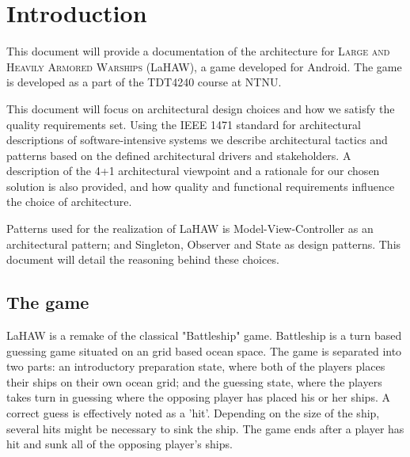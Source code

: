 \chapter{Introduction}
This document will provide a documentation of the architecture for \textsc{Large and Heavily Armored Warships} (LaHAW), a game developed for Android. The game is developed as a part of the TDT4240 course at NTNU.

This document will focus on architectural design choices and how we satisfy the quality requirements set. Using the IEEE 1471 standard for architectural descriptions of software-intensive systems\cite{IEEE1471} we describe architectural tactics and patterns based on the defined architectural drivers and stakeholders. A description of the 4+1 architectural viewpoint\cite{kruchten} and a rationale for our chosen solution is also provided, and how quality and functional requirements influence the choice of architecture.

Patterns used for the realization of LaHAW is Model-View-Controller as an architectural pattern; and Singleton, Observer and State as design patterns. This document will detail the reasoning behind these choices.

	\section{The game}
	LaHAW is a remake of the classical "Battleship" game\cite{battleship}. Battleship is a turn based guessing game situated on an grid based ocean space. The game is separated into two parts: an introductory preparation state, where both of the players places their ships on their own ocean grid; and the guessing state, where the players takes turn in guessing where the opposing player has placed his or her ships. A correct guess is effectively noted as a 'hit'. Depending on the size of the ship, several hits might be necessary to sink the ship. The game ends after a player has hit and sunk all of the opposing player's ships.